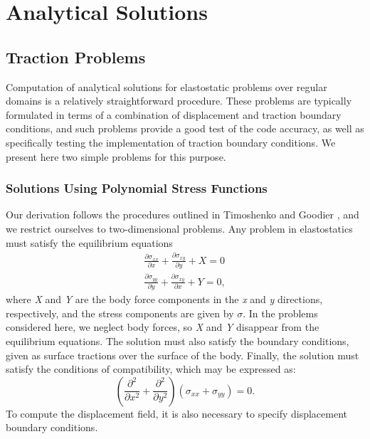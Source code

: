
\chapter{\label{cha:Analytical-Solns}Analytical Solutions}


\section{\label{sec:TractionProblems}Traction Problems}

Computation of analytical solutions for elastostatic problems over
regular domains is a relatively straightforward procedure. These problems
are typically formulated in terms of a combination of displacement
and traction boundary conditions, and such problems provide a good
test of the code accuracy, as well as specifically testing the implementation
of traction boundary conditions. We present here two simple problems
for this purpose.


\subsection{Solutions Using Polynomial Stress Functions}

Our derivation follows the procedures outlined in Timoshenko and Goodier
\cite{Timoshenko:Goodier:1987}, and we restrict ourselves to two-dimensional
problems. Any problem in elastostatics must satisfy the equilibrium
equations
\begin{gather}
\frac{\partial\sigma_{xx}}{\partial x}+\frac{\partial\sigma_{xy}}{\partial y}+X=0\label{eq:traction:1}\\
\frac{\partial\sigma_{yy}}{\partial y}+\frac{\partial\sigma_{xy}}{\partial x}+Y=0,\nonumber 
\end{gather}
where \textit{X} and \textit{Y} are the body force components in the
\textit{x} and \textit{y} directions, respectively, and the stress
components are given by $\sigma$. In the problems considered here,
we neglect body forces, so \textit{X} and \textit{Y} disappear from
the equilibrium equations. The solution must also satisfy the boundary
conditions, given as surface tractions over the surface of the body.
Finally, the solution must satisfy the conditions of compatibility,
which may be expressed as:
\begin{equation}
\left(\frac{\partial^{2}}{\partial x^{2}}+\frac{\partial^{2}}{\partial y^{2}}\right)\left(\sigma_{xx}+\sigma_{yy}\right)=0.\label{eq:traction:2}
\end{equation}
To compute the displacement field, it is also necessary to specify
displacement boundary conditions.

